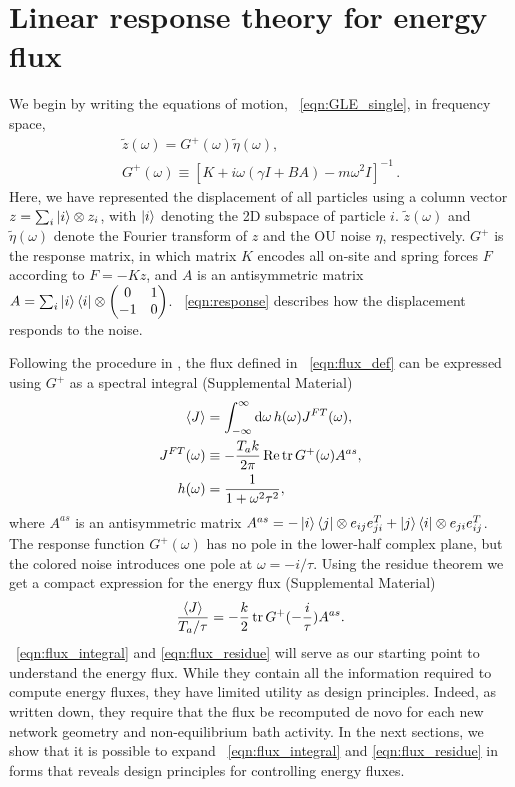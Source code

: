 \documentclass[
 preprint,
 preprintnumbers,
 amsmath,amssymb,
 aps,
 pre,
 longbibliography,
 superscriptaddress,
 10pt, twocolumn
]{revtex4-1}
\begin{document}
\section{Linear response theory for energy flux} \label{sec:linear_response}
We begin by writing the equations of motion, \eqnname~\eqref{eqn:GLE_single}, in frequency space,
\begin{gather}
    \tilde{z}(\omega) = G^+(\omega) \tilde{\eta}(\omega), \label{eqn:response} \\
    G^{+}(\omega) \equiv [K + i\omega(\gamma I + BA) - m\omega^2I]^{-1}\,. \label{eqn:response_G}
\end{gather}
Here, we have represented the displacement of all particles using a column vector $z=\sum_i \ket{i}\otimes z_i$, with $\ket{i}$ denoting the 2D subspace of particle $i$. $\tilde{z}(\omega)$ and $\tilde{\eta}(\omega)$ denote the Fourier transform of $z$ and the OU noise $\eta$, respectively. $G^+$ is the response matrix, in which matrix $K$ encodes all on-site and spring forces $F$ according to $F=-Kz$, and $A$ is an antisymmetric matrix $A=\sum_i \ket{i}\bra{i}\otimes \mqty(0 & 1 \\ -1 & 0)$. \eqnname~\eqref{eqn:response} describes how the displacement responds to the noise.

Following the procedure in \cite{Kundu2011LargeDeviations}, the flux defined in \eqnname~\eqref{eqn:flux_def} can be expressed using $G^+$ as a spectral integral (Supplemental Material)
\begin{align}
    \expval{J} &= \int_{-\infty}^\infty \dd{\omega} h(\omega) J^{FT}(\omega), \label{eqn:flux_integral} \\
    J^{FT}(\omega) &\equiv -\frac{T_a k}{2\pi} \Re \tr G^+(\omega)A^{as}, \\
    h(\omega) &= \frac{1}{1+\omega^2\tau^2},
\end{align}
where $A^{as}$ is an antisymmetric matrix
$A^{as} = -\ket{i}\bra{j} \otimes e_{ij}e_{ji}^T + \ket{j}\bra{i} \otimes e_{ji}e_{ij}^T$.
The response function $G^+(\omega)$ has no pole in the lower-half complex plane, but the colored noise introduces one pole at $\omega = -i/\tau$. Using the residue theorem we get a compact expression for the energy flux (Supplemental Material)
\begin{equation} \label{eqn:flux_residue}
    \frac{\expval{J}}{T_a/\tau} = -\frac{k}{2} \tr G^+(-\frac{i}{\tau})A^{as} .
\end{equation}
\eqnname~\eqref{eqn:flux_integral} and \eqref{eqn:flux_residue} will serve as our starting point to understand the energy flux. While they contain all the information required to compute energy fluxes, they have limited utility as design principles. Indeed, as written down, they require that the flux be recomputed de novo for each new network geometry and non-equilibrium bath activity. In the next sections, we show that it is possible to expand \eqnname~\eqref{eqn:flux_integral} and \eqref{eqn:flux_residue} in forms that reveals design principles for controlling energy fluxes.
\end{document}
